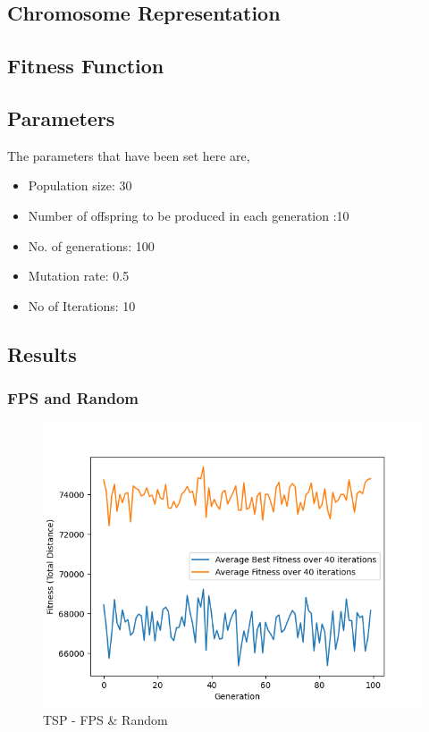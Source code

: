 \documentclass[11pt, letterpaper]{article}
\begin{document}
\subsection{Chromosome Representation}

\subsection{Fitness Function}
\subsection{Parameters}
The parameters that have been set here are,
\begin{itemize}
    \item Population size: 30
    \item Number of offspring to be produced in each generation :10
    \item No. of generations: 100
    \item Mutation rate: 0.5
    \item No of Iterations: 10
\end{itemize}
\subsection{Results} 
\subsubsection {FPS and Random}
\begin{figure}[H]
    \centering
    \includegraphics[scale = 0.6]{images/tsp_fp_rd.png}
    \caption {TSP - FPS \& Random}
    \label {fig:tpsFR}
\end{figure}
\end{document}
